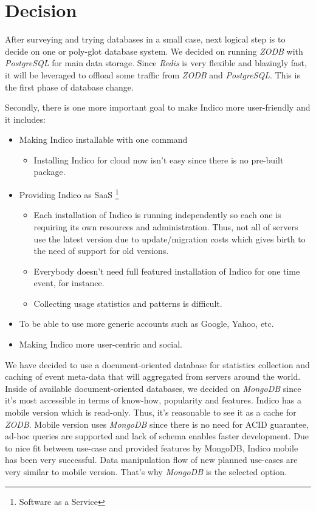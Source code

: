 \chapter{Decision}

After surveying and trying databases in a small case, next logical step is to decide on one or poly-glot database system. We decided on running \textit{ZODB} with \textit{PostgreSQL} for main data storage. Since \textit{Redis} is very flexible and blazingly fast, it will be leveraged to offload some traffic from \textit{ZODB} and \textit{PostgreSQL}. This is the first phase of database change.

Secondly, there is one more important goal to make Indico more user-friendly and it includes:
\begin{itemize}
  \item Making Indico installable with one command
  \begin{itemize}
    \item Installing Indico for cloud now isn't easy since there is no pre-built package.
  \end{itemize}
  \item Providing Indico as SaaS \footnote{Software as a Service}
  \begin{itemize}
    \item Each installation of Indico is running independently so each one is requiring its own resources and administration. Thus, not all of servers use the latest version due to update/migration costs which gives birth to the need of support for old versions.
    \item Everybody doesn't need full featured installation of Indico for one time event, for instance.
    \item Collecting usage statistics and patterns is difficult.
  \end{itemize}
  \item To be able to use more generic accounts such as Google, Yahoo, etc.
  \item Making Indico more user-centric and social.
\end{itemize}

We have decided to use a document-oriented database for statistics collection and caching of event meta-data that will aggregated from servers around the world. Inside of available document-oriented databases, we decided on \textit{MongoDB} since it's most accessible in terms of know-how, popularity and features. Indico has a mobile version which is read-only. Thus, it's reasonable to see it as a cache for \textit{ZODB}. Mobile version uses \textit{MongoDB} since there is no need for ACID guarantee, ad-hoc queries are supported and lack of schema enables faster development. Due to nice fit between use-case and provided features by MongoDB, Indico mobile has been very successful. Data manipulation flow of new planned use-cases are very similar to mobile version. That's why \textit{MongoDB} is the selected option.

